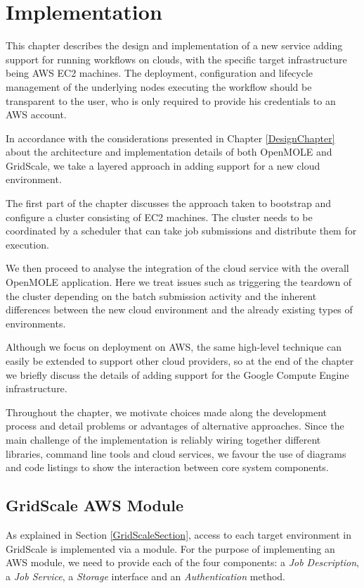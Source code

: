 \chapter{Implementation}

This chapter describes the design and implementation of a new service adding support for running workflows on clouds, with the specific target infrastructure being AWS EC2 machines. The deployment, configuration and lifecycle management of the underlying nodes executing the workflow should be transparent to the user, who is only required to provide his credentials to an AWS account.

In accordance with the considerations presented in Chapter \ref{DesignChapter} about the architecture and implementation details of both OpenMOLE and GridScale, we take a layered approach in adding support for a new cloud environment.

The first part of the chapter discusses the approach taken to bootstrap and configure a cluster consisting of EC2 machines. The cluster needs to be coordinated by a scheduler that can take job submissions and distribute them for execution.

We then proceed to analyse the integration of the cloud service with the overall OpenMOLE application. Here we treat issues such as triggering the teardown of the cluster depending on the batch submission activity and the inherent differences between the new cloud environment and the already existing types of environments.

Although we focus on deployment on AWS, the same high-level technique can easily be extended to support other cloud providers, so at the end of the chapter we briefly discuss the details of adding support for the Google Compute Engine infrastructure.

Throughout the chapter, we motivate choices made along the development process and detail problems or advantages of alternative approaches. Since the main challenge of the implementation is reliably wiring together different libraries, command line tools and cloud services, we favour the use of diagrams and code listings to show the interaction between core system components.

\section{GridScale AWS Module}

As explained in Section \ref{GridScaleSection}, access to each target environment in GridScale is implemented via a module. For the purpose of implementing an AWS module, we need to provide each of the four components: a \textit{Job Description}, a \textit{Job Service}, a \textit{Storage} interface and an \textit{Authentication} method.

